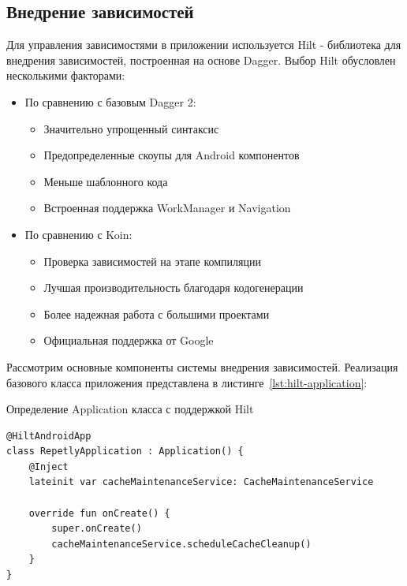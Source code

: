\documentclass[14pt, russian]{scrartcl}
\begin{document}
\subsection{Внедрение зависимостей}\label{sect:di}

Для управления зависимостями в приложении используется Hilt - библиотека для внедрения зависимостей, построенная на основе Dagger. Выбор Hilt обусловлен несколькими факторами:

\begin{itemize}
\item По сравнению с базовым Dagger 2:
  \begin{itemize}
  \item Значительно упрощенный синтаксис
  \item Предопределенные скоупы для Android компонентов
  \item Меньше шаблонного кода
  \item Встроенная поддержка WorkManager и Navigation
  \end{itemize}
\item По сравнению с Koin:
  \begin{itemize}
  \item Проверка зависимостей на этапе компиляции
  \item Лучшая производительность благодаря кодогенерации
  \item Более надежная работа с большими проектами
  \item Официальная поддержка от Google
  \end{itemize}
\end{itemize}

Рассмотрим основные компоненты системы внедрения зависимостей. Реализация базового класса приложения представлена в листинге~\ref{lst:hilt-application}:

\begin{listing}[!htb]
\caption{Определение Application класса с поддержкой Hilt}
\vspace{-0.3cm}
\label{lst:hilt-application}
\begin{verbatim}
@HiltAndroidApp
class RepetlyApplication : Application() {
    @Inject
    lateinit var cacheMaintenanceService: CacheMaintenanceService

    override fun onCreate() {
        super.onCreate()
        cacheMaintenanceService.scheduleCacheCleanup()
    }
}
\end{verbatim}
\end{listing}
\end{document}
